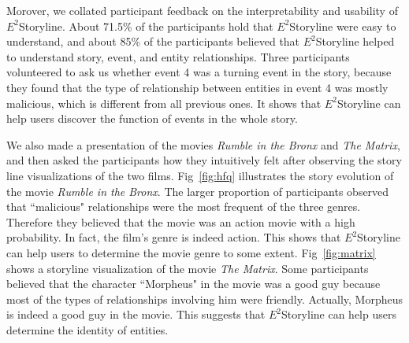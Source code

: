 \documentclass[review,journal]{vgtc}         %
\begin{document}
Morover, we collated participant feedback on the interpretability and usability of $E^2$Storyline. About 71.5\% of the participants hold that $E^2$Storyline were easy to understand, and about 85\% of the participants believed that $E^2$Storyline helped to understand story, event, and entity relationships. Three participants volunteered to ask us whether event 4 was a turning event in the story, because they found that the type of relationship between entities in event 4 was mostly malicious, which is different from all previous ones. It shows that $E^2$Storyline can help users discover the function of events in the whole story.

We also made a presentation of the movies \textit{Rumble in the Bronx} and \textit{The Matrix}, and then asked the participants how they intuitively felt after observing the story line visualizations of the two films. Fig~\ref{fig:hfq} illustrates the story evolution of the movie \textit{Rumble in the Bronx}. The larger proportion of participants observed that ``malicious" relationships were the most frequent of the three genres. Therefore they believed that the movie was an action movie with a high probability. In fact, the film's genre is indeed action. This shows that $E^2$Storyline can help users to determine the movie genre to some extent. Fig~\ref{fig:matrix} shows a storyline visualization of the movie \textit{The Matrix}. Some participants believed that the character ``Morpheus" in the movie was a good guy because most of the types of relationships involving him were friendly. Actually, Morpheus is indeed a good guy in the movie. This suggests that $E^2$Storyline can help users determine the identity of entities.
\end{document}
